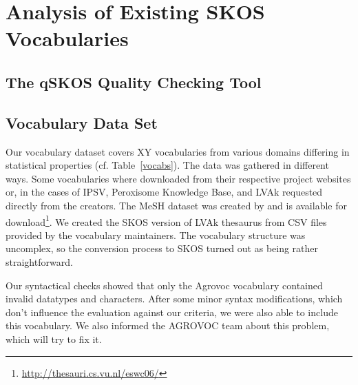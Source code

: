 
\section{Analysis of Existing SKOS Vocabularies}\label{sec:analysis}

\subsection{The qSKOS Quality Checking Tool}


\subsection{Vocabulary Data Set}
Our vocabulary dataset covers XY vocabularies from various domains differing in statistical properties (cf. Table~\ref{vocabs}). The data was gathered in different ways. Some vocabularies where downloaded from their respective project websites or, in the cases of IPSV, Peroxisome Knowledge Base, and LVAk requested directly from the creators. The MeSH dataset was created by \cite{Assem2006} and is available for download\footnote{\url{http://thesauri.cs.vu.nl/eswc06/}}. We created the SKOS version of LVAk thesaurus from CSV files provided by the vocabulary maintainers. The vocabulary structure was uncomplex, so the conversion process to SKOS turned out as being rather straightforward. 
 
Our syntactical checks showed that only the Agrovoc vocabulary contained invalid datatypes and characters. After some minor syntax modifications, which don’t influence the evaluation against our criteria, we were also able to include this vocabulary. We also informed the AGROVOC team about this problem, which will try to fix it.


